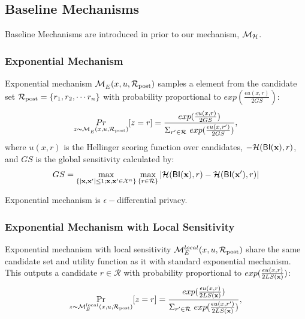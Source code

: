 \documentclass{article}
\begin{document}
\subsection{Baseline Mechanisms}
\label{subsec_baselines}
Baseline Mechanisms are introduced in prior to our mechanism, $\mathcal{M}_{\mathcal{H}}$.

\subsubsection{Exponential Mechanism}
Exponential mechanism $\mathcal{M}_E^{}({x},{u},{\mathcal{R}_{\textup{post}}})$ samples a element from the candidate set $\mathcal{R}_{\textup{post}} = \{r_1, r_2, \cdots r_n\}$ with probability proportional to $exp(\frac{\epsilon u(x,r)}{2 GS})$:
\begin{equation*}
\underset{z \thicksim \mathcal{M}_E^{}({x},{u},{\mathcal{R}_{\textup{post}}}) }{Pr}[z=r] = \frac
{exp(\frac{\epsilon u(x,r)}{2 GS})}
{\Sigma_{r' \in \mathcal{R}}\ exp(\frac{\epsilon u(x,r')}{2 GS})},
\end{equation*}
where $u(x,r)$ is the Hellinger scoring function over candidates, $-\mathcal{H}(\mathsf{BI}(\textbf{x}), r)$, and $GS$ is the global sensitivity calculated by:
\begin{equation*}
GS = 
\max_{\{|\textbf{x},\textbf{x}'| \leq 1;\textbf{x},\textbf{x}'\in \mathcal{X}^n\}}\max_{\{r\in \mathcal{R}\}}
|\mathcal{H}(\mathsf{BI}(\textbf{x}), r) - \mathcal{H}(\mathsf{BI}(\textbf{x}'), r)|
\end{equation*}

Exponential mechanism is $\epsilon -$differential privacy\cite{dwork2014algorithmic}.


\subsubsection{Exponential Mechanism with Local Sensitivity}
\label{subsec_emls}
Exponential mechanism with local sensitivity $\mathcal{M}_E^{local}({x},{u},{\mathcal{R}_{\textup{post}}})$ share the same candidate set and utility function as it with standard exponential mechanism. This outputs a candidate $r \in \mathcal{R}$ with probability proportional to $exp(\frac{\epsilon u(x,r)}{2 LS(\textbf{x})})$:
\begin{equation*}
\underset{z \thicksim \mathcal{M}_E^{local}({x},{u},{\mathcal{R}_{\textup{post}}})}{\Pr}[z=r] = \frac
{exp(\frac{\epsilon u(x,r)}{2 LS(\textbf{x})})}
{\Sigma_{r' \in \mathcal{R}}\ exp(\frac{\epsilon u(x,r')}{2 LS(\textbf{x})})},
\end{equation*}
\end{document}
